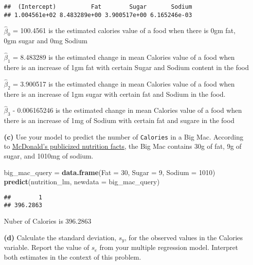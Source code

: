 \documentclass[
]{article}
\newenvironment{Shaded}{\begin{snugshade}}{\end{snugshade}}
\newcommand{\DataTypeTok}[1]{\textcolor[rgb]{0.13,0.29,0.53}{#1}}
\newcommand{\DecValTok}[1]{\textcolor[rgb]{0.00,0.00,0.81}{#1}}
\newcommand{\KeywordTok}[1]{\textcolor[rgb]{0.13,0.29,0.53}{\textbf{#1}}}
\newcommand{\NormalTok}[1]{#1}
\newcommand{\OperatorTok}[1]{\textcolor[rgb]{0.81,0.36,0.00}{\textbf{#1}}}
\newcommand{\StringTok}[1]{\textcolor[rgb]{0.31,0.60,0.02}{#1}}
\begin{document}
\begin{verbatim}
##  (Intercept)          Fat        Sugar       Sodium 
## 1.004561e+02 8.483289e+00 3.900517e+00 6.165246e-03
\end{verbatim}

\(\hat{\beta}_0\) = 100.4561 is the estimated calories value of a food
when there is 0gm fat, 0gm sugar and 0mg Sodium

\(\hat{\beta}_1\) = 8.483289 is the estimated change in mean Calories
value of a food when there is an increase of 1gm fat with certain Sugar
and Sodium content in the food

\(\hat{\beta}_2\) = 3.900517 is the estimated change in mean Calories
value of a food when there is an increase of 1gm sugar with certain fat
and Sodium in the food.

\(\hat{\beta}_3\) - 0.006165246 is the estimated change in mean Calories
value of a food when there is an increase of 1mg of Sodium with certain
fat and sugare in the food

\textbf{(c)} Use your model to predict the number of \texttt{Calories}
in a Big Mac. According to
\href{https://www.mcdonalds.com/us/en-us/about-our-food/nutrition-calculator.html}{McDonald's
publicized nutrition facts}, the Big Mac contains 30g of fat, 9g of
sugar, and 1010mg of sodium.

\begin{Shaded}
\begin{Highlighting}[]
\NormalTok{big_mac_query =}\StringTok{ }\KeywordTok{data.frame}\NormalTok{(}\DataTypeTok{Fat =} \DecValTok{30}\NormalTok{, }\DataTypeTok{Sugar =} \DecValTok{9}\NormalTok{, }\DataTypeTok{Sodium =} \DecValTok{1010}\NormalTok{)}
\KeywordTok{predict}\NormalTok{(nutrition_lm, }\DataTypeTok{newdata =}\NormalTok{ big_mac_query)}
\end{Highlighting}
\end{Shaded}

\begin{verbatim}
##        1 
## 396.2863
\end{verbatim}

Nuber of Calories is 396.2863

\textbf{(d)} Calculate the standard deviation, \(s_y\), for the observed
values in the Calories variable. Report the value of \(s_e\) from your
multiple regression model. Interpret both estimates in the context of
this problem.

\begin{Shaded}
\end{Shaded}
\end{document}
